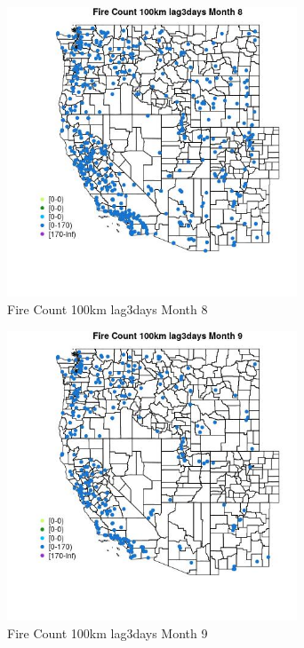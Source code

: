 \begin{figure} 
\centering  
\includegraphics[width=0.77\textwidth]{Code_Outputs/Report_ML_input_PM25_Step4_part_e_de_duplicated_aves_compiled_2019-05-18wNAs_MapObsMo8Fire_Count_100km_lag3days.jpg} 
\caption{\label{fig:Report_ML_input_PM25_Step4_part_e_de_duplicated_aves_compiled_2019-05-18wNAsMapObsMo8Fire_Count_100km_lag3days}Fire Count 100km lag3days Month 8} 
\end{figure} 
 

\begin{figure} 
\centering  
\includegraphics[width=0.77\textwidth]{Code_Outputs/Report_ML_input_PM25_Step4_part_e_de_duplicated_aves_compiled_2019-05-18wNAs_MapObsMo9Fire_Count_100km_lag3days.jpg} 
\caption{\label{fig:Report_ML_input_PM25_Step4_part_e_de_duplicated_aves_compiled_2019-05-18wNAsMapObsMo9Fire_Count_100km_lag3days}Fire Count 100km lag3days Month 9} 
\end{figure} 
 

